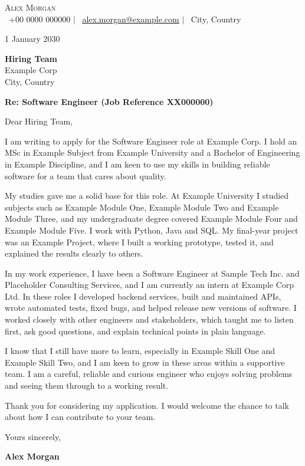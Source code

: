 \documentclass[letterpaper,11pt]{article}
\begin{document}
\begin{center}
    {\Huge \scshape Alex Morgan} \\ \vspace{5pt}
    \small
    \faMobile\ +00 0000 000000 \hspace{10pt} $|$ \hspace{10pt}
    \faEnvelope\ \href{mailto:alex.morgan@example.com}{\underline{alex.morgan@example.com}} \hspace{10pt} $|$ \hspace{10pt}
    \faMapMarker\ City, Country
\end{center}

\vspace{4pt}
1 January 2030

\textbf{Hiring Team} \\
Example Corp \\
City, Country

\textbf{Re: Software Engineer (Job Reference XX000000)}

Dear Hiring Team,

I am writing to apply for the Software Engineer role at Example Corp. I hold an MSc in Example Subject from Example University and a Bachelor of Engineering in Example Discipline, and I am keen to use my skills in building reliable software for a team that cares about quality.

My studies gave me a solid base for this role. At Example University I studied subjects such as Example Module One, Example Module Two and Example Module Three, and my undergraduate degree covered Example Module Four and Example Module Five. I work with Python, Java and SQL. My final-year project was an Example Project, where I built a working prototype, tested it, and explained the results clearly to others.

In my work experience, I have been a Software Engineer at Sample Tech Inc. and Placeholder Consulting Services, and I am currently an intern at Example Corp Ltd. In these roles I developed backend services, built and maintained APIs, wrote automated tests, fixed bugs, and helped release new versions of software. I worked closely with other engineers and stakeholders, which taught me to listen first, ask good questions, and explain technical points in plain language.

I know that I still have more to learn, especially in Example Skill One and Example Skill Two, and I am keen to grow in these areas within a supportive team. I am a careful, reliable and curious engineer who enjoys solving problems and seeing them through to a working result.

Thank you for considering my application. I would welcome the chance to talk about how I can contribute to your team.

Yours sincerely,

\vspace{14pt}

\textbf{Alex Morgan}
\end{document}
